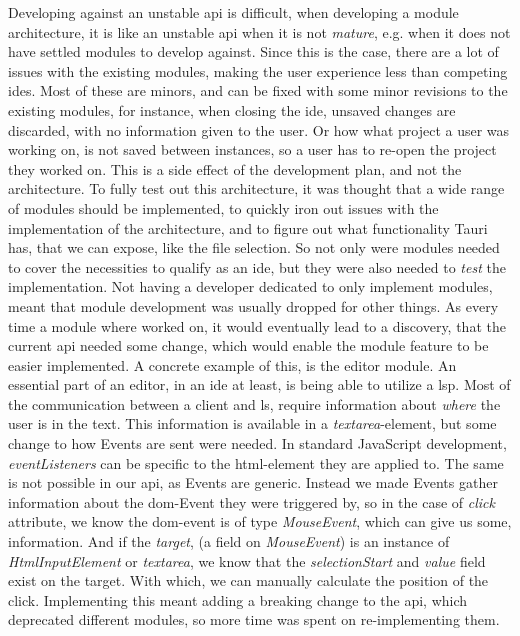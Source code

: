Developing against an unstable \gls*{api} is difficult, when developing a module
architecture, it is like an unstable \gls*{api} when it is not \textit{mature},
e.g. when it does not have settled modules to develop against. Since this is
the case, there are a lot of issues with the existing modules, making the user
experience less than competing \gls*{ide}s. Most of these are minors, and can be
fixed with some minor revisions to the existing modules, for instance, when
closing the \gls*{ide}, unsaved changes are discarded, with no information given
to the user. Or how what project a user was working on, is not saved between
instances, so a user has to re-open the project they worked on. This is a side
effect of the development plan, and not the architecture. To fully test out this
architecture, it was thought that a wide range of modules should be implemented,
to quickly iron out issues with the implementation of the architecture, and to
figure out what functionality Tauri has, that we can expose, like the file
selection.
So not only were modules needed to cover the necessities to qualify as an
\gls*{ide}, but they were also needed to \textit{test} the implementation. Not
having a developer dedicated to only implement modules, meant that module
development was usually dropped for other things. As every time a module where
worked on, it would eventually lead to a discovery, that the current \gls*{api}
needed some change, which would enable the module feature to be easier
implemented. A concrete example of this, is the editor module.
An essential part of an editor, in an \gls*{ide} at least, is being able to
utilize a \gls*{lsp}. Most of the communication between a client and \gls*{ls},
require information about \textit{where} the user is in the text. This
information is available in a \textit{textarea}-element, but some change to how
Events are sent were needed. In standard JavaScript development,
\textit{eventListeners} can be specific to the \gls*{html}-element they are
applied to. The same is not possible in our \gls*{api}, as Events are generic.
Instead we made Events gather information about the \gls*{dom}-Event they were
triggered by, so in the case of \textit{click} attribute, we know the
\gls*{dom}-event is of type \textit{MouseEvent}, which can give us some,
information. And if the \textit{target}, (a field on \textit{MouseEvent}) is an
instance of \textit{HtmlInputElement} or \textit{textarea}, we know that the
\textit{selectionStart} and \textit{value} field exist on the target. With
which, we can manually calculate the position of the click. Implementing this
meant adding a breaking change to the \gls*{api}, which deprecated different
modules, so more time was spent on re-implementing them.

